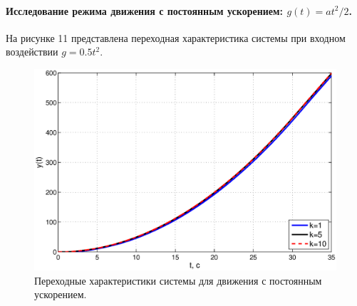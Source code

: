 \documentclass[12pt,a4paper]{article}
\begin{document}
\paragraph*{Исследование режима движения с постоянным ускорением: $g(t)=at^2/2$.} 
На рисунке 11 представлена переходная характеристика системы при входном воздействии $g=0.5t^2$.
\begin{figure}[H]
	\centering
	\includegraphics[width=0.95\linewidth]{2.3.eps}
	\caption{Переходные характеристики системы для движения с постоянным ускорением.}
\end{figure}

\newpage
\end{document}
